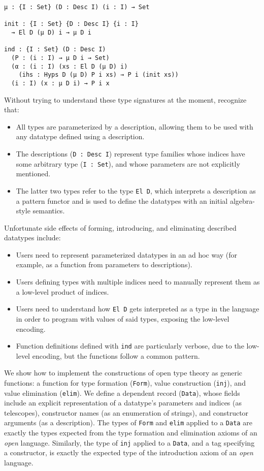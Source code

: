 \documentclass[preprint,nonatbib]{sigplanconf}
\begin{document}
\begin{verbatim}
μ : {I : Set} (D : Desc I) (i : I) → Set

init : {I : Set} {D : Desc I} {i : I}
  → El D (μ D) i → μ D i

ind : {I : Set} (D : Desc I)
  (P : (i : I) → μ D i → Set)
  (α : (i : I) (xs : El D (μ D) i)
    (ihs : Hyps D (μ D) P i xs) → P i (init xs))
  (i : I) (x : μ D i) → P i x
\end{verbatim}

Without trying to understand these type signatures at the moment,
recognize that:

\begin{itemize}
\item{}
All types are parameterized by a description, allowing them to be used with any
datatype defined using a description.
\item{}
The descriptions ({\tt D : Desc I}) represent type families whose indices
have some arbitrary type ({\tt I : Set}), and whose parameters are not
explicitly mentioned.
\item{}
The latter two types refer to the type {\tt El D}, which interprets a
description as a pattern functor and is used to define the datatypes with an
initial algebra-style semantics.
\end{itemize}

Unfortunate side effects of forming, introducing, and eliminating described
datatypes include:

\begin{itemize}
\item{}
Users need to represent parameterized datatypes in an ad hoc way (for
example, as a function from parameters to descriptions).
\item{}
Users defining types with multiple indices need to manually represent
them as a low-level product of indices.
\item{}
Users need to understand how {\tt El D} gets interpreted as a type in
the language in order to program with values of said types, exposing
the low-level encoding.
\item{}
Function definitions defined with {\tt ind} are particularly verbose,
due to the low-level encoding, but the functions follow a common pattern.
\end{itemize}

We show how to implement the constructions of open type theory as
generic functions: a function for type formation ({\tt Form}), value
construction ({\tt inj}), and value elimination ({\tt elim}).
We define a dependent record ({\tt Data}), whose fields include an explicit
representation of a datatype's parameters and indices (as telescopes),
constructor names (as an enumeration of strings),
and constructor arguments (as a description).
The types of {\tt Form} and {\tt elim} applied to a {\tt Data} are
exactly the types expected from the type formation and elimination
axioms of an {\it open} language. Similarly, the type of {\tt inj}
applied to a {\tt Data}, and a tag specifying a constructor, is exactly the
expected type of the introduction axiom of an
{\it open} language.
\end{document}
